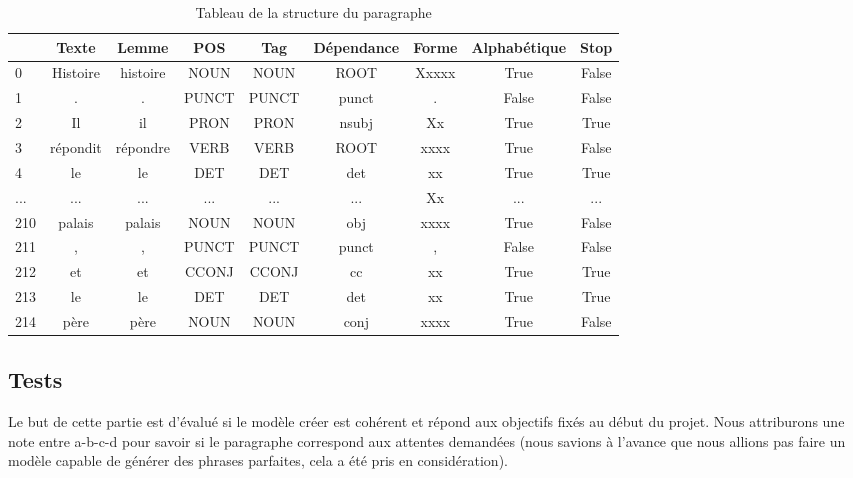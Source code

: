 \documentclass{rapport}
\begin{document}
                \begin{table}[H]
                    \centering
                    \begin{tabular}{l|cccccccc}
                        \toprule
                        & Texte & Lemme & POS & Tag & Dépendance & Forme & Alphabétique & Stop \\
                        \midrule
                        0 & Histoire & histoire & NOUN & NOUN & ROOT & Xxxxx & True & False \\
                        1 & . & . & PUNCT & PUNCT & punct & . & False & False \\
                        2 & Il & il & PRON & PRON & nsubj & Xx & True & True \\
                        3 & répondit & répondre & VERB & VERB & ROOT & xxxx & True & False \\
                        4 & le & le & DET & DET & det & xx & True & True \\
                        ... & ... & ... & ... & ... & ... & Xx & ... & ... \\
                        210 & palais & palais & NOUN & NOUN & obj & xxxx & True & False \\
                        211 & , & , & PUNCT & PUNCT & punct & , & False & False \\
                        212 & et & et & CCONJ & CCONJ & cc & xx & True & True \\
                        213 & le & le & DET & DET & det & xx & True & True \\
                        214 & père & père & NOUN & NOUN & conj & xxxx & True & False \\
                        \bottomrule
                    \end{tabular}
                    \caption{Tableau de la structure du paragraphe}
                    \label{tab:paragraph_structure_table}
                \end{table}

        \subsection{Tests}

            Le but de cette partie est d'évalué si le modèle créer est cohérent et répond aux objectifs fixés au début du projet. Nous attriburons une note entre a-b-c-d pour savoir si le paragraphe correspond aux attentes demandées (nous savions à l'avance que nous allions pas faire un modèle capable de générer des phrases parfaites, cela a été pris en considération).
\end{document}
